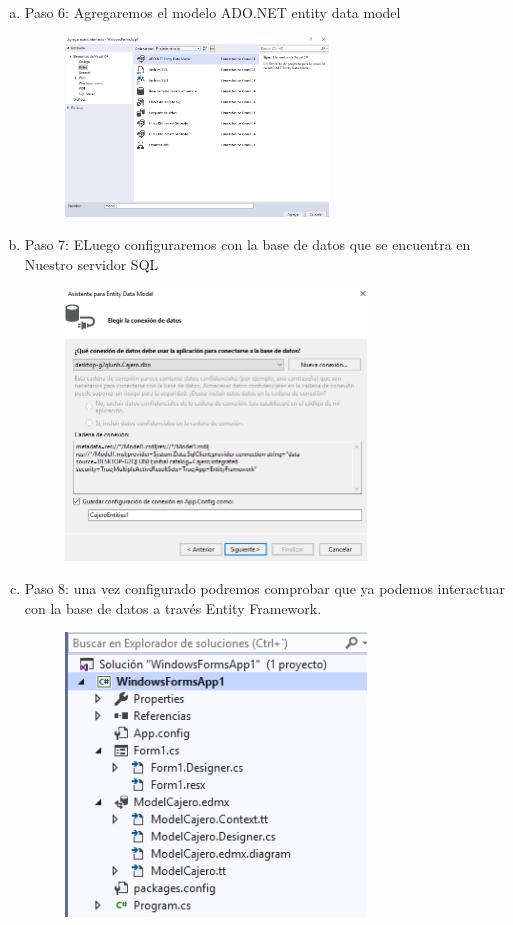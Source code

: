 \begin{enumerate}[1.]
\begin{enumerate}[a)]
\begin{figure}[H]
\begin{center}
		\end{center}
		\end{figure}
	\item Paso 6: Agregaremos el modelo ADO.NET entity data model
		\begin{figure}[H]
		\begin{center}
		\includegraphics[width=7cm]{./Imagenes/img6}
		\end{center}
		\end{figure}
	\item Paso 7: ELuego configuraremos con la base de datos que se encuentra en Nuestro servidor SQL 
		\begin{figure}[H]
		\begin{center}
		\includegraphics[width=8cm]{./Imagenes/img7}
		\end{center}
		\end{figure}
	\item Paso 8: una vez configurado podremos comprobar que ya podemos interactuar con la base de datos a través Entity Framework.
		\begin{figure}[H]
		\begin{center}
		\includegraphics[width=8cm]{./Imagenes/img8}

\end{center}
\end{figure}
\end{enumerate}
\end{enumerate}

